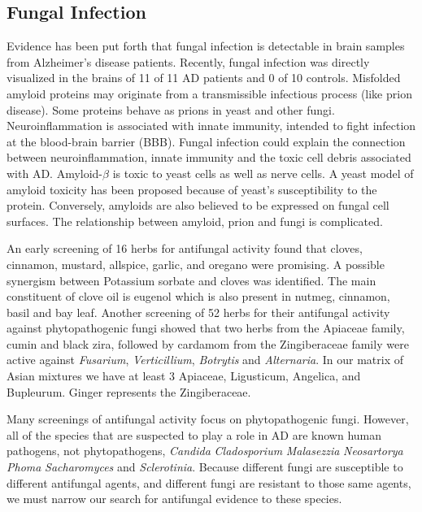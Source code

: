\documentclass[twocolumn]{article}
\begin{document}
\subsection{Fungal Infection}

Evidence has been put forth that fungal infection is detectable
in brain samples from Alzheimer's disease patients.
\cite{alonso2013fungal}
Recently, fungal infection was directly visualized in the brains
of 11 of 11 AD patients and 0 of 10 controls.
\cite{pisa2015different}
Misfolded amyloid proteins may originate from a transmissible infectious process
(like prion disease).
Some proteins behave as prions in yeast and other fungi.
\cite{soto2006amyloids}
Neuroinflammation is associated with innate immunity,
intended to fight infection at the blood-brain barrier (BBB).
\cite{hauwel2005innate}
Fungal infection could explain the connection between
neuroinflammation, innate immunity and the toxic cell
debris associated with AD.
Amyloid-$\beta$ is toxic to yeast cells
as well as nerve cells.
A yeast model of amyloid toxicity has been proposed
because of yeast's susceptibility to the protein.
\cite{treusch2011functional}
Conversely, amyloids are also believed to be
expressed on fungal cell surfaces.
\cite{gebbink2005amyloids}
The relationship between amyloid, prion and fungi is complicated.
\cite{tessier2009unraveling}






%
An early screening of 16 herbs for antifungal activity
found that cloves, cinnamon, mustard, allspice, garlic, and oregano
were promising.
A possible synergism between Potassium sorbate and cloves
was identified.
\cite{azzouz1982comparative}
The main constituent of clove oil is eugenol which
is also present in nutmeg, cinnamon, basil and bay leaf.
\cite{?}
Another screening of 52 herbs for their antifungal activity
against phytopathogenic fungi showed that two herbs from the Apiaceae family,
cumin and black zira, followed by cardamom from the Zingiberaceae family
were active against \textit{Fusarium}, \textit{Verticillium},
\textit{Botrytis} and \textit{Alternaria}.
In our matrix of Asian mixtures we have at least 3 Apiaceae,
Ligusticum,
Angelica,
and Bupleurum.
Ginger represents the Zingiberaceae.


Many screenings of antifungal activity focus on phytopathogenic fungi.
However, all of the species that are suspected to play a role in
AD are known human pathogens, not phytopathogens,
\textit{Candida}
\textit{Cladosporium}
\textit{Malasezzia}
\textit{Neosartorya}
\textit{Phoma}
\textit{Sacharomyces}
and \textit{Sclerotinia}.
Because different fungi are susceptible to different antifungal agents,
and different fungi are resistant to those same agents,
we must narrow our search for antifungal evidence to these species.
\end{document}
